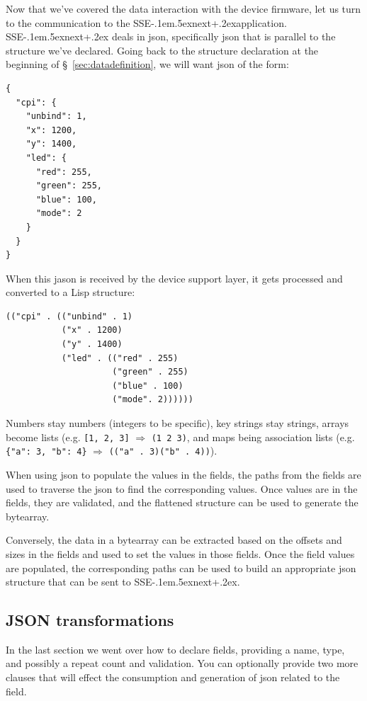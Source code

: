 \documentclass[12pt]{article}
\def\SSEnext{SSE\kern-.1em\lower.5ex\hbox{\footnotesize next}\kern+.2ex}
\def\SSEnext{SSE\kern-.1em\lower.5ex\hbox{\footnotesize next}\kern+.2ex}
\begin{document}
Now that we've covered the data interaction with the device firmware,
let us turn to the communication to the \SSEnext application. \SSEnext
deals in json, specifically json that is parallel to the structure we've
declared. Going back to the structure declaration at the beginning of
\S~\ref{sec:datadefinition}, we will want json of the form:

\begin{verbatim}
{
  "cpi": {
    "unbind": 1,
    "x": 1200,
    "y": 1400,
    "led": {
      "red": 255,
      "green": 255,
      "blue": 100,
      "mode": 2
    }
  }
}
\end{verbatim}

When this jason is received by the device support layer, it gets
processed and converted to a Lisp structure: 

\begin{verbatim}
(("cpi" . (("unbind" . 1)
           ("x" . 1200)
           ("y" . 1400)
           ("led" . (("red" . 255)
                     ("green" . 255)
                     ("blue" . 100)
                     ("mode". 2))))))
\end{verbatim}

Numbers stay numbers (integers to be specific), key strings stay
strings, arrays become lists (e.g. \verb|[1, 2, 3]| $\Rightarrow$
\verb|(1 2 3)|, and maps being association lists (e.g.
\verb|{"a": 3, "b": 4}| $\Rightarrow$ \verb|(("a" . 3)("b" . 4))|).

When using json to populate the values in the fields, the paths from
the fields are used to traverse the json to find the corresponding
values. Once values are in the fields, they are validated, and the
flattened structure can be used to generate the bytearray.

Conversely, the data in a bytearray can be extracted based on the
offsets and sizes in the fields and used to set the values in those
fields. Once the field values are populated, the corresponding paths
can be used to build an appropriate json structure that can be sent to
\SSEnext. 

\subsection{JSON transformations}

In the last section we went over how to declare fields, providing a
name, type, and possibly a repeat count and validation. You can
optionally provide two more clauses that will effect the consumption and
generation of json related to the field.
\end{document}
